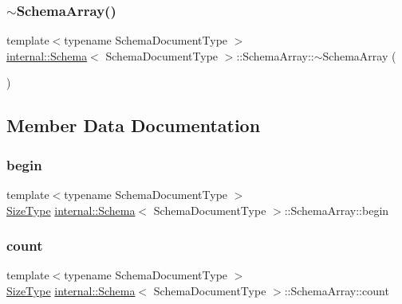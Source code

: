 \subsubsection{\texorpdfstring{$\sim$\+Schema\+Array()}{~SchemaArray()}}
{\footnotesize\ttfamily template$<$typename Schema\+Document\+Type $>$ \\
\hyperlink{classinternal_1_1Schema}{internal\+::\+Schema}$<$ Schema\+Document\+Type $>$\+::Schema\+Array\+::$\sim$\+Schema\+Array (\begin{DoxyParamCaption}{ }\end{DoxyParamCaption})\hspace{0.3cm}{\ttfamily [inline]}}



\subsection{Member Data Documentation}
\mbox{\label{structinternal_1_1Schema_1_1SchemaArray_aec3fb901025ec5fd76b7f534670f6d6a}} 
\subsubsection{\texorpdfstring{begin}{begin}}
{\footnotesize\ttfamily template$<$typename Schema\+Document\+Type $>$ \\
\hyperlink{rapidjson_8h_a5ed6e6e67250fadbd041127e6386dcb5}{Size\+Type} \hyperlink{classinternal_1_1Schema}{internal\+::\+Schema}$<$ Schema\+Document\+Type $>$\+::Schema\+Array\+::begin}

\mbox{\label{structinternal_1_1Schema_1_1SchemaArray_adeea8252bb8f70972a0669c671953414}} 
\subsubsection{\texorpdfstring{count}{count}}
{\footnotesize\ttfamily template$<$typename Schema\+Document\+Type $>$ \\
\hyperlink{rapidjson_8h_a5ed6e6e67250fadbd041127e6386dcb5}{Size\+Type} \hyperlink{classinternal_1_1Schema}{internal\+::\+Schema}$<$ Schema\+Document\+Type $>$\+::Schema\+Array\+::count}

